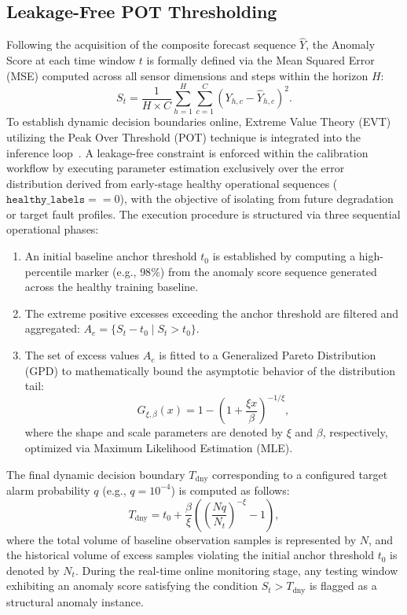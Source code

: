 \documentclass[runningheads]{llncs}
\begin{document}
\subsection{Leakage-Free POT Thresholding} \label{sect:s3dot5}
Following the acquisition of the composite forecast sequence $\widehat{Y}$, the Anomaly Score at each time window $t$ is formally defined via the Mean Squared Error (MSE) computed across all sensor dimensions and steps within the horizon $H$:
\begin{equation}
\label{eq:anomaly_score}
S_{t} = \frac{1}{H \times C} \sum_{h = 1}^{H} \sum_{c = 1}^{C} \left(Y_{h, c} - \widehat{Y}_{h, c}\right)^{2}.
\tag{22}
\end{equation}
To establish dynamic decision boundaries online, Extreme Value Theory (EVT) utilizing the Peak Over Threshold (POT) technique is integrated into the inference loop~\cite{ref-10}. A leakage-free constraint is enforced within the calibration workflow by executing parameter estimation exclusively over the error distribution derived from early-stage healthy operational sequences ($\texttt{healthy\_labels} == 0$), with the objective of isolating from future degradation or target fault profiles. The execution procedure is structured via three sequential operational phases:
\begin{enumerate}
    \item An initial baseline anchor threshold $t_{0}$ is established by computing a high-percentile marker (e.g., $98\%$) from the anomaly score sequence generated across the healthy training baseline.
    \item The extreme positive excesses exceeding the anchor threshold are filtered and aggregated: $A_{e} = \{ S_{t} - t_{0} \mid S_{t} > t_{0} \}$.
    \item The set of excess values $A_{e}$ is fitted to a Generalized Pareto Distribution (GPD) to mathematically bound the asymptotic behavior of the distribution tail:
    \begin{equation}
    G_{\xi , \beta} (x) = 1 - \left(1 + \frac {\xi x}{\beta}\right) ^ {- 1 / \xi},
    \tag{23}
    \end{equation}
    where the shape and scale parameters are denoted by $\xi$ and $\beta$, respectively, optimized via Maximum Likelihood Estimation (MLE).
\end{enumerate}

The final dynamic decision boundary $T_{\mathrm{dny}}$ corresponding to a configured target alarm probability $q$ (e.g., $q = 10^{-4}$) is computed as follows:
\begin{equation}
T_{\mathrm{dny}} = t_{0} + \frac{\beta}{\xi} \left(\left(\frac{N q}{N_{t}}\right)^{-\xi} - 1\right),
\tag{24}
\end{equation}
where the total volume of baseline observation samples is represented by $N$, and the historical volume of excess samples violating the initial anchor threshold $t_{0}$ is denoted by $N_{t}$. During the real-time online monitoring stage, any testing window exhibiting an anomaly score satisfying the condition $S_{t} > T_{\mathrm{dny}}$ is flagged as a structural anomaly instance.
\end{document}
